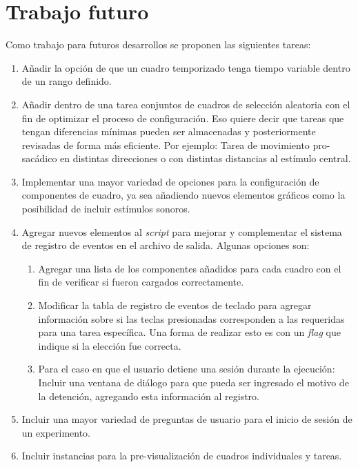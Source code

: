 \documentclass[\main/main.tex]{subfiles}
\begin{document}
	\section{Trabajo futuro}
	\label{sec:05_trabajo_futuro}
		Como trabajo para futuros desarrollos se proponen las siguientes tareas:
		\begin{enumerate}\setlength\itemsep{-0.2em}
			\item Añadir la opción de que un cuadro temporizado tenga tiempo variable dentro de un rango definido.
			\item Añadir dentro de una tarea conjuntos de cuadros de selección aleatoria con el fin de optimizar el proceso de configuración. Eso quiere decir que tareas que tengan diferencias mínimas pueden ser almacenadas y posteriormente revisadas de forma más eficiente. Por ejemplo: Tarea de movimiento pro-sacádico en distintas direcciones o con distintas distancias al estímulo central.  
			\item Implementar una mayor variedad de opciones para la configuración de componentes de cuadro, ya sea añadiendo nuevos elementos gráficos como la posibilidad de incluir estímulos sonoros.  
			\item Agregar nuevos elementos al \textit{script} para mejorar y complementar el sistema de registro de eventos en el archivo de salida. Algunas opciones son:
				\begin{enumerate}\setlength\itemsep{-0.2em}
					\item Agregar una lista de los componentes añadidos para cada cuadro con el fin de verificar si fueron cargados correctamente.
					\item Modificar la tabla de registro de eventos de teclado para agregar información sobre si las teclas presionadas corresponden a las requeridas para una tarea específica. Una forma de realizar esto es con un \textit{flag} que indique si la elección fue correcta. 
					\item Para el caso en que el usuario detiene una sesión durante la ejecución: Incluir una ventana de diálogo para que pueda ser ingresado el motivo de la detención, agregando esta información al registro. 

				\end{enumerate}
			\item Incluir una mayor variedad de preguntas de usuario para el inicio de sesión de un experimento. 
			\item Incluir instancias para la pre-visualización de cuadros individuales y tareas.

		\end{enumerate}
	
\end{document}
